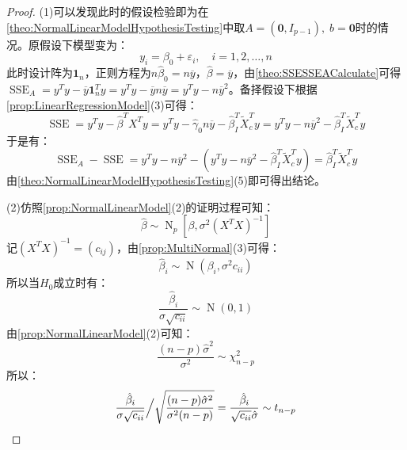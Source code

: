 \begin{proof}
	(1)可以发现此时的假设检验即为在\cref{theo:NormalLinearModelHypothesisTesting}中取$A=(\mathbf{0},I_{p-1}),\;b=\mathbf{0}$时的情况。原假设下模型变为：
	\begin{equation*}
		y_i=\beta_0+\varepsilon_i,\quad i=1,2,\dots,n
	\end{equation*}
	此时设计阵为$\mathbf{1}_n$，正则方程为$n\hat{\beta}_0=n\overline{y}$，$\hat{\beta}=\overline{y}$，由\cref{theo:SSESSEACalculate}可得$\operatorname{SSE}_A=y^Ty-\overline{y}\mathbf{1}_n^Ty=y^Ty-\overline{y}n\overline{y}=y^Ty-n\overline{y}^2$。备择假设下根据\cref{prop:LinearRegressionModel}(3)可得：
	\begin{equation*}
		\operatorname{SSE}=y^Ty-\hat{\beta}^TX^Ty=y^Ty-\hat{\gamma}_0n\overline{y}-\hat{\beta}_I^T\tilde{X}_c^Ty=y^Ty-n\overline{y}^2-\hat{\beta}_I^T\tilde{X}_c^Ty
	\end{equation*}
	于是有：
	\begin{equation*}
		\operatorname{SSE}_A-\operatorname{SSE}=y^Ty-n\overline{y}^2-(y^Ty-n\overline{y}^2-\hat{\beta}_I^T\tilde{X}_c^Ty)=\hat{\beta}_I^T\tilde{X}_c^Ty
	\end{equation*}
	由\cref{theo:NormalLinearModelHypothesisTesting}(5)即可得出结论。\par
	(2)仿照\cref{prop:NormalLinearModel}(2)的证明过程可知：
	\begin{equation*}
		\hat{\beta}\sim\operatorname{N}_p[\beta,\sigma^2(X^TX)^{-1}]
	\end{equation*}
	记$(X^TX)^{-1}=(c_{ij})$，由\cref{prop:MultiNormal}(3)可得：
	\begin{equation*}
		\hat{\beta}_i\sim\operatorname{N}(\beta_i,\sigma^2c_{ii})
	\end{equation*}
	所以当$H_0$成立时有：
	\begin{equation*}
		\frac{\hat{\beta}_i}{\sigma\sqrt{c_{ii}}}\sim\operatorname{N}(0,1)
	\end{equation*}
	由\cref{prop:NormalLinearModel}(2)可知：
	\begin{equation*}
		\frac{(n-p)\hat{\sigma}^2}{\sigma^2}\sim\chi_{n-p}^2
	\end{equation*}
	所以：
	\begin{equation*}
		\frac{\hat{\beta}_i}{\sigma\sqrt{c_{ii}}}\Big/\sqrt{\frac{(n-p)\hat{\sigma}^2}{\sigma^2(n-p)}}=\frac{\hat{\beta}_i}{\sqrt{c_{ii}}\hat{\sigma}}\sim t_{n-p}\qedhere
	\end{equation*}
\end{proof}

